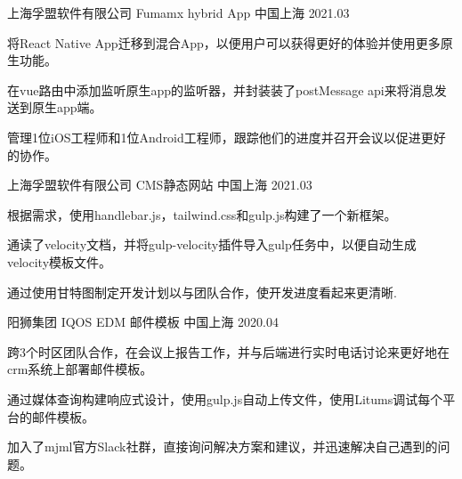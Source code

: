 

\begin{cventries}

  \cventry
    {上海孚盟软件有限公司} %
    {Fumamx hybrid App} %
    {中国上海} %
    {2021.03} %
    {
      \begin{cvitems} %
        \item {将React Native App迁移到混合App，以便用户可以获得更好的体验并使用更多原生功能。}
        \item {在vue路由中添加监听原生app的监听器，并封装装了postMessage api来将消息发送到原生app端。}
        \item {管理1位iOS工程师和1位Android工程师，跟踪他们的进度并召开会议以促进更好的协作。}
      \end{cvitems}
    }


    \cventry
    {上海孚盟软件有限公司} %
    {CMS静态网站} %
    {中国上海} %
    {2021.03} %
    {
      \begin{cvitems} %
        \item {根据需求，使用handlebar.js，tailwind.css和gulp.js构建了一个新框架。}
        \item {通读了velocity文档，并将gulp-velocity插件导入gulp任务中，以便自动生成velocity模板文件。}
        \item {通过使用甘特图制定开发计划以与团队合作，使开发进度看起来更清晰.}
      \end{cvitems}
    }

    \cventry
    {阳狮集团} %
    {IQOS EDM 邮件模板} %
    {中国上海} %
    {2020.04} %
    {
      \begin{cvitems} %
        \item {跨3个时区团队合作，在会议上报告工作，并与后端进行实时电话讨论来更好地在crm系统上部署邮件模板。}
        \item {通过媒体查询构建响应式设计，使用gulp.js自动上传文件，使用Litums调试每个平台的邮件模板。}
        \item {加入了mjml官方Slack社群，直接询问解决方案和建议，并迅速解决自己遇到的问题。}
      \end{cvitems}
    }

\end{cventries}
